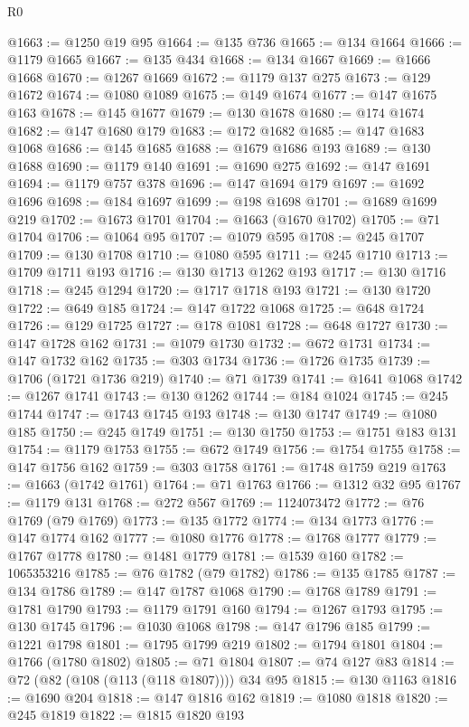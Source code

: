 \begin{lexlean}{R0}
\begin{coremodule}
@1663 := @1250 @19 @95
@1664 := @135 @736
@1665 := @134 @1664
@1666 := @1179 @1665
@1667 := @135 @434
@1668 := @134 @1667
@1669 := @1666 @1668
@1670 := @1267 @1669
@1672 := @1179 @137 @275
@1673 := @129 @1672
@1674 := @1080 @1089
@1675 := @149 @1674
@1677 := @147 @1675 @163
@1678 := @145 @1677
@1679 := @130 @1678
@1680 := @174 @1674
@1682 := @147 @1680 @179
@1683 := @172 @1682
@1685 := @147 @1683 @1068
@1686 := @145 @1685
@1688 := @1679 @1686 @193
@1689 := @130 @1688
@1690 := @1179 @140
@1691 := @1690 @275
@1692 := @147 @1691
@1694 := @1179 @757 @378
@1696 := @147 @1694 @179
@1697 := @1692 @1696
@1698 := @184 @1697
@1699 := @198 @1698
@1701 := @1689 @1699 @219
@1702 := @1673 @1701
@1704 := @1663 (@1670 @1702)
@1705 := @71 @1704
@1706 := @1064 @95
@1707 := @1079 @595
@1708 := @245 @1707
@1709 := @130 @1708
@1710 := @1080 @595
@1711 := @245 @1710
@1713 := @1709 @1711 @193
@1716 := @130 @1713 @1262 @193
@1717 := @130 @1716
@1718 := @245 @1294
@1720 := @1717 @1718 @193
@1721 := @130 @1720
@1722 := @649 @185
@1724 := @147 @1722 @1068
@1725 := @648 @1724
@1726 := @129 @1725
@1727 := @178 @1081
@1728 := @648 @1727
@1730 := @147 @1728 @162
@1731 := @1079 @1730
@1732 := @672 @1731
@1734 := @147 @1732 @162
@1735 := @303 @1734
@1736 := @1726 @1735
@1739 := @1706 (@1721 @1736 @219)
@1740 := @71 @1739
@1741 := @1641 @1068
@1742 := @1267 @1741
@1743 := @130 @1262
@1744 := @184 @1024
@1745 := @245 @1744
@1747 := @1743 @1745 @193
@1748 := @130 @1747
@1749 := @1080 @185
@1750 := @245 @1749
@1751 := @130 @1750
@1753 := @1751 @183 @131
@1754 := @1179 @1753
@1755 := @672 @1749
@1756 := @1754 @1755
@1758 := @147 @1756 @162
@1759 := @303 @1758
@1761 := @1748 @1759 @219
@1763 := @1663 (@1742 @1761)
@1764 := @71 @1763
@1766 := @1312 @32 @95
@1767 := @1179 @131
@1768 := @272 @567
@1769 := 1124073472
@1772 := @76 @1769 (@79 @1769)
@1773 := @135 @1772
@1774 := @134 @1773
@1776 := @147 @1774 @162
@1777 := @1080 @1776
@1778 := @1768 @1777
@1779 := @1767 @1778
@1780 := @1481 @1779
@1781 := @1539 @160
@1782 := 1065353216
@1785 := @76 @1782 (@79 @1782)
@1786 := @135 @1785
@1787 := @134 @1786
@1789 := @147 @1787 @1068
@1790 := @1768 @1789
@1791 := @1781 @1790
@1793 := @1179 @1791 @160
@1794 := @1267 @1793
@1795 := @130 @1745
@1796 := @1030 @1068
@1798 := @147 @1796 @185
@1799 := @1221 @1798
@1801 := @1795 @1799 @219
@1802 := @1794 @1801
@1804 := @1766 (@1780 @1802)
@1805 := @71 @1804
@1807 := @74 @127 @83
@1814 := @72 (@82 (@108 (@113 (@118 @1807)))) @34 @95
@1815 := @130 @1163
@1816 := @1690 @204
@1818 := @147 @1816 @162
@1819 := @1080 @1818
@1820 := @245 @1819
@1822 := @1815 @1820 @193

\end{coremodule}
\end{lexlean}
